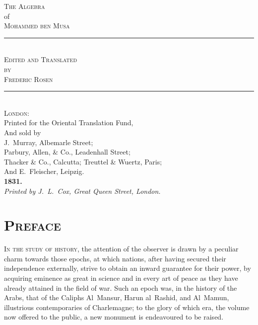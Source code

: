 \thispagestyle{empty}
\begin{center}
\vspace*{2cm}

{\fontsize{28}{34}\selectfont\scshape\color{titlecolor} The Algebra}\\[0.8cm]
{\fontsize{14}{18}\selectfont\color{sectioncolor} of}\\[0.8cm]
{\fontsize{28}{34}\selectfont\scshape\color{titlecolor} Mohammed ben Musa}\\[2cm]

\rule{0.5\textwidth}{1pt}\\[1cm]

{\Large\scshape Edited and Translated}\\[0.3cm]
{\Large\scshape by}\\[0.3cm]
{\Large\scshape Frederic Rosen}\\[2cm]

\rule{0.5\textwidth}{1pt}\\[1cm]

{\normalsize
\textsc{London}:\\
Printed for the Oriental Translation Fund,\\
And sold by\\
J.~Murray, Albemarle Street;\\
Parbury, Allen, \& Co., Leadenhall Street;\\
Thacker \& Co., Calcutta; Treuttel \& Wuertz, Paris;\\
And E.~Fleischer, Leipzig.\\[0.5cm]
\textbf{1831.}
}\\[1cm]

{\small\textit{Printed by J.~L.~Cox, Great Queen Street, London.}}

\vfill
\end{center}
\clearpage

\thispagestyle{empty}
\null\clearpage

\section*{\textsc{Preface}}

\lettrine{I}{n the study of history,} the attention of the observer is drawn by a peculiar charm towards those epochs, at which nations, after having secured their independence externally, strive to obtain an inward guarantee for their power, by acquiring eminence as great in science and in every art of peace as they have already attained in the field of war. Such an epoch was, in the history of the Arabs, that of the Caliphs Al~Mansur, Harun al~Rashid, and Al~Mamun, illustrious contemporaries of Charlemagne; to the glory of which era, the volume now offered to the public, a new monument is endeavoured to be raised.

